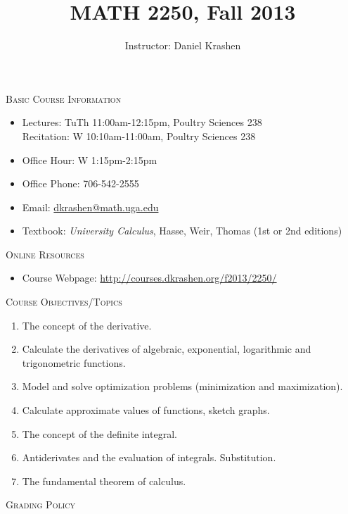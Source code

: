 \documentclass[12pt]{amsart}
\title{MATH 2250, Fall 2013}
\author{Instructor: Daniel Krashen}
\begin{document}
\maketitle


\thispagestyle{empty}
\noindent
\textsc{Basic Course Information}

\begin{itemize}
\item
Lectures: TuTh 11:00am-12:15pm, Poultry Sciences 238 \\
Recitation: W 10:10am-11:00am, Poultry Sciences 238
\item 
Office Hour: W 1:15pm-2:15pm
\item
Office Phone: 706-542-2555 
\item
Email: \url{dkrashen@math.uga.edu} 
\item
Textbook: \textit{University Calculus}, Hasse, Weir, Thomas (1st or
2nd editions)
\end{itemize}

\medskip

\noindent
\textsc{Online Resources}

\begin{itemize}
\item
Course Webpage:  
\url{http://courses.dkrashen.org/f2013/2250/} 
\end{itemize}

\medskip

\noindent
\textsc{Course Objectives/Topics}

\begin{enumerate}
\item
The concept of the derivative.
\item
Calculate the derivatives of algebraic, exponential, logarithmic and
trigonometric functions.
\item
Model and solve optimization problems (minimization and
maximization).
\item
Calculate approximate values of functions, sketch graphs.
\item
The concept of the definite integral.
\item
Antiderivates and the evaluation of integrals. Substitution. 
\item
The fundamental theorem of calculus.
\end{enumerate}

\medskip

\noindent
\textsc{Grading Policy}
\end{document}
